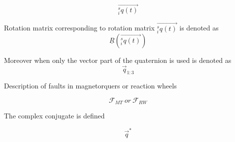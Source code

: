 \begin{equation*}
\vec{^s_i q(t)}
\end{equation*}


Rotation matrix corresponding to rotation matrix $\vec{^s_i q(t)}$ is denoted as
\begin{equation*}
\underline{R}(\vec{^s_i q(t)})
\end{equation*}

Moreover when only the vector part of the quaternion is used is denoted as 
\begin{equation*}
\vec{q}_{1:3}
\end{equation*}

Description of faults in magnetorquers or reaction wheels

\begin{equation*}
\mathcal{F}_{MT} \ or  \  \mathcal{F}_{RW}
\end{equation*}

The complex conjugate is defined

\begin{equation*}
 \vec q^\ast
\end{equation*}

